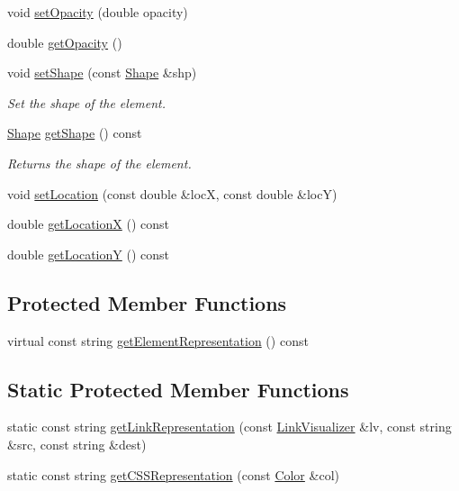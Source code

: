 \begin{DoxyCompactItemize}
void \mbox{\hyperlink{classbridges_1_1datastructure_1_1_element_acb5d0b5734a6b3c17b7b1784ae1dc79c}{set\+Opacity}} (double opacity)
\item 
double \mbox{\hyperlink{classbridges_1_1datastructure_1_1_element_acf14bfc12da42565b237a7bd79bd36c2}{get\+Opacity}} ()
\item 
void \mbox{\hyperlink{classbridges_1_1datastructure_1_1_element_a1ef398bf1027244a624575e58a569ed9}{set\+Shape}} (const \mbox{\hyperlink{namespacebridges_1_1datastructure_a3408f5f44d9c6062e5f3adb7e1bbb7f0}{Shape}} \&shp)
\begin{DoxyCompactList}\small\item\em Set the shape of the element. \end{DoxyCompactList}\item 
\mbox{\hyperlink{namespacebridges_1_1datastructure_a3408f5f44d9c6062e5f3adb7e1bbb7f0}{Shape}} \mbox{\hyperlink{classbridges_1_1datastructure_1_1_element_acb8680aa406733d36411fd189017706c}{get\+Shape}} () const
\begin{DoxyCompactList}\small\item\em Returns the shape of the element. \end{DoxyCompactList}\item 
void \mbox{\hyperlink{classbridges_1_1datastructure_1_1_element_af3af017c9d6efcbc2124d0231b57e7a6}{set\+Location}} (const double \&locX, const double \&locY)
\item 
double \mbox{\hyperlink{classbridges_1_1datastructure_1_1_element_a471f2f69147deb0f514bb9720e0e18ea}{get\+LocationX}} () const
\item 
double \mbox{\hyperlink{classbridges_1_1datastructure_1_1_element_a6394039086bc1f27f2e6adf73294a74b}{get\+LocationY}} () const
\end{DoxyCompactItemize}
\subsection*{Protected Member Functions}
\begin{DoxyCompactItemize}
\item 
virtual const string \mbox{\hyperlink{classbridges_1_1datastructure_1_1_element_a285fc51d6dfcb8bff2d72f7e4addfe6d}{get\+Element\+Representation}} () const
\end{DoxyCompactItemize}
\subsection*{Static Protected Member Functions}
\begin{DoxyCompactItemize}
\item 
static const string \mbox{\hyperlink{classbridges_1_1datastructure_1_1_element_a0d43c0aaa96192b49dfc0a499d63a325}{get\+Link\+Representation}} (const \mbox{\hyperlink{classbridges_1_1datastructure_1_1_link_visualizer}{Link\+Visualizer}} \&lv, const string \&src, const string \&dest)
\item 
static const string \mbox{\hyperlink{classbridges_1_1datastructure_1_1_element_afc6de63b836064024721d72b7ffa52bf}{get\+C\+S\+S\+Representation}} (const \mbox{\hyperlink{classbridges_1_1datastructure_1_1_color}{Color}} \&col)
\end{DoxyCompactItemize}
